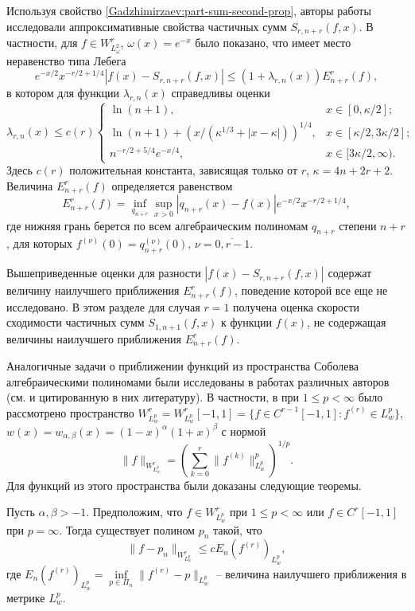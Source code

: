 Используя свойство \eqref{Gadzhimirzaev:part-sum-second-prop}, авторы работы \cite{Gadzhimirzaev:ShII-MMG} исследовали аппроксимативные свойства частичных сумм $S_{r,n+r}(f,x)$. В частности, для $f\in W^r_{L^2_\omega}$, $\omega(x)=e^{-x}$ было показано,
что имеет место неравенство типа Лебега~\cite[теорема 5.2]{Gadzhimirzaev:ShII-MMG}
$$
e^{-x/2}x^{-r/2+1/4}|f(x)-S_{r,n+r}(f,x)|\le (1+\lambda_{r,n}(x))E_{n+r}^r(f),
$$
в котором для функции $\lambda_{r,n}(x)$ справедливы оценки
$$
\lambda_{r,n}(x)\le c(r)
\begin{cases}
	\ln(n+1), & x\in[0,\kappa/2]; \\
	\ln(n+1)+(x/(\kappa^{1/3}+|x-\kappa|))^{1/4}, & x\in[\kappa/2,3\kappa/2]; \\
	n^{-r/2+5/4}e^{-x/4}, & x\in[3\kappa/2,\infty).
\end{cases}
$$
Здесь $c(r)$ положительная константа, зависящая только от $r$, $\kappa=4n+2r+2$.
Величина $E_{n+r}^r(f)$ определяется равенством
$$
E_{n+r}^r(f)=\inf_{q_{n+r}}\sup_{x>0}|q_{n+r}(x)-f(x)|e^{-x/2}x^{-r/2+1/4},
$$
где нижняя грань берется по всем алгебраическим полиномам $q_{n+r}$ степени $n+r$, для которых $f^{(\nu)}(0)=q_{n+r}^{(\nu)}(0)$, $\nu=\overline{0,r-1}$.

Вышеприведенные оценки для разности $|f(x)-S_{r,n+r}(f,x)|$ содержат величину наилучшего приближения $E_{n+r}^r(f)$, поведение которой все еще не исследовано. В этом разделе для случая $r=1$ получена оценка скорости сходимости частичных сумм $S_{1,n+1}(f,x)$ к функции $f(x)$, не содержащая величины наилучшего приближения $E_{n+r}^r(f)$.

Аналогичные задачи о приближении функций из пространства Соболева алгебраическими полиномами были исследованы в работах различных авторов
(см. \cite{Approx-Xu, Approx-XuWang, Approx-Juan, Approx-Leonardo} и цитированную в них литературу). В частности, в \cite{Approx-Xu} при $1\le p<\infty$ было рассмотрено пространство $W^r_{L^p_w}=W^r_{L^p_w}[-1,1]=\{f\in C^{r-1}[-1,1]: f^{(r)}\in L^p_w\}$, $w(x)=w_{\alpha,\beta}(x)=(1-x)^\alpha(1+x)^\beta$ с нормой
$$
\|f\|_{W^r_{L^p_w}}=\left(\sum_{k=0}^{r}\|f^{(k)}\|^p_{L^p_w}\right)^{1/p}.
$$
Для функций из этого пространства были доказаны следующие теоремы.

\begin{theoremA}
	Пусть $\alpha,\beta>-1$. Предположим, что $f\in W^r_{L^p_w}$ при $1\le p<\infty$ или $f\in C^r[-1,1]$ при $p=\infty$. Тогда существует полином $p_n$ такой, что
	$$
	\|f-p_n\|_{W^r_{L^p_w}}\le c E_n(f^{(r)})_{L^p_w},
	$$
	где $E_n(f^{(r)})_{L^p_w}=\inf\limits_{p\in\Pi_n}\|f^{(r)}-p\|_{L^p_w}$ -- величина наилучшего приближения в метрике $L^p_w$.
\end{theoremA}

